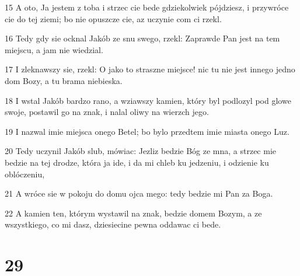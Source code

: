 \par 15 A oto, Ja jestem z toba i strzec cie bede gdziekolwiek pójdziesz, i przywróce cie do tej ziemi; bo nie opuszcze cie, az uczynie com ci rzekl.
\par 16 Tedy gdy sie ocknal Jakób ze snu swego, rzekl: Zaprawde Pan jest na tem miejscu, a jam nie wiedzial.
\par 17 I zleknawszy sie, rzekl: O jako to straszne miejsce! nic tu nie jest innego jedno dom Bozy, a tu brama niebieska.
\par 18 I wstal Jakób bardzo rano, a wziawszy kamien, który byl podlozyl pod glowe swoje, postawil go na znak, i nalal oliwy na wierzch jego.
\par 19 I nazwal imie miejsca onego Betel; bo bylo przedtem imie miasta onego Luz.
\par 20 Tedy uczynil Jakób slub, mówiac: Jezliz bedzie Bóg ze mna, a strzec mie bedzie na tej drodze, która ja ide, i da mi chleb ku jedzeniu, i odzienie ku oblóczeniu,
\par 21 A wróce sie w pokoju do domu ojca mego: tedy bedzie mi Pan za Boga.
\par 22 A kamien ten, którym wystawil na znak, bedzie domem Bozym, a ze wszystkiego, co mi dasz, dziesiecine pewna oddawac ci bede.

\chapter{29}

